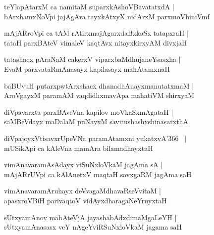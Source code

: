 \documentclass[twoside,12pt,openright]{book}
\newcounter{shloka}[chapter]
\begin{document}
\begin{shloka}%
teYlapAtarxM ca namitaM suparxkAshoVBavatatxdA |\\
bArxhamxNoVpi jajAgAra tayxkAtxyX nidArxM parxmoVhiniVmf 
\end{shloka}

\begin{shloka}%
mAjARroVpi ca tAM rAtirxmajAgarxdaBxkaSx tatapxraH |\\
tataH parxBAteV vimaleV kaqtAvx nitayxkirxyAM divxjaH
\end{shloka}

\begin{shloka}%
tatashacx pAraNaM cakerxV viparxbaMdhujaneYsasxha |\\
EvaM parxvataRmAnasayx kapilasayx mahAtamxnaH 
\end{shloka}

\begin{shloka}%
baBUvuH putarxpwtArxshacx dhanadhAnayxmanutatxmaM |\\
AroVgayxM paramAM vaqdidhxmavApa mahatiVM shirxyaM 
\end{shloka}

\begin{shloka}%
diVpavarxta parxBAveVna kapilov moVkaSxmAgataH |\\
saMBeVdayx maDalaM puNayxM savitushashxshinasatxthA 
\end{shloka}

\begin{shloka}%
diVpajoyxVtisavxrUpeVNa paramAtamxni yukatxvA\char'366 ~|\\
mUSikApi ca kAleVna mamAra bilamadhayxtaH 
\end{shloka}

\begin{shloka}%
vimAnavaramAsAdayx viSuNxloVkaM jagAma sA |\\
mAjARrUVpi ca kAlAnetxV maqtaH savxgaRM jagAma saH 
\end{shloka}

\begin{shloka}%
vimAnavaramAruhayx deVvagaMdhavaRseVvitaM |\\
apasxroVBiH parivaqtoV vidAyxdharagaNeYruyxtaH 
\end{shloka}

\begin{shloka}%
sUtxyamAnov mahAteVjA jayashabAdxdimaMgaLeYH |\\
sUtxyamAnasasx veY nAgeYviRSuNxloVkaM jagama saH 
\end{shloka}
\end{document}
